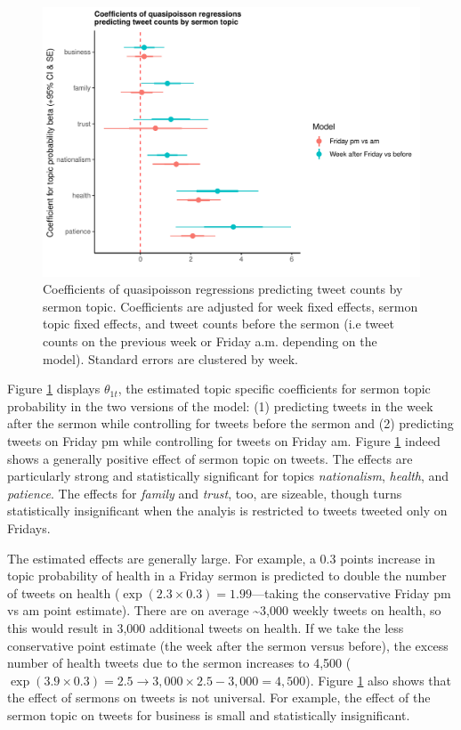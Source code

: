 \documentclass[
  12pt,
]{article}
\begin{document}
\begin{figure}

{\centering \includegraphics{Khutbas_files/figure-latex/fig-8-1} 

}

\caption{Coefficients of quasipoisson regressions predicting tweet counts by sermon topic. Coefficients are adjusted for week fixed effects, sermon topic fixed effects, and tweet counts before the sermon (i.e tweet counts on the previous week or Friday a.m. depending on the model). Standard errors are clustered by week.}\label{fig:fig-8}
\end{figure}

Figure \ref{fig:fig-8} displays \(\theta_{1t}\), the estimated topic specific coefficients for sermon topic probability in the two versions of the model: (1) predicting tweets in the week after the sermon while controlling for tweets before the sermon and (2) predicting tweets on Friday pm while controlling for tweets on Friday am. Figure \ref{fig:fig-8} indeed shows a generally positive effect of sermon topic on tweets. The effects are particularly strong and statistically significant for topics \emph{nationalism}, \emph{health}, and \emph{patience}. The effects for \emph{family} and \emph{trust}, too, are sizeable, though turns statistically insignificant when the analyis is restricted to tweets tweeted only on Fridays.

The estimated effects are generally large. For example, a 0.3 points increase in topic probability of health in a Friday sermon is predicted to double the number of tweets on health (\(\exp(2.3 \times 0.3)=1.99\)---taking the conservative Friday pm vs am point estimate). There are on average \textasciitilde3,000 weekly tweets on health, so this would result in 3,000 additional tweets on health. If we take the less conservative point estimate (the week after the sermon versus before), the excess number of health tweets due to the sermon increases to 4,500 (\(\exp(3.9 \times 0.3)=2.5 \rightarrow 3,000 \times 2.5 - 3,000 = 4,500\)). Figure \ref{fig:fig-8} also shows that the effect of sermons on tweets is not universal. For example, the effect of the sermon topic on tweets for business is small and statistically insignificant.
\end{document}
